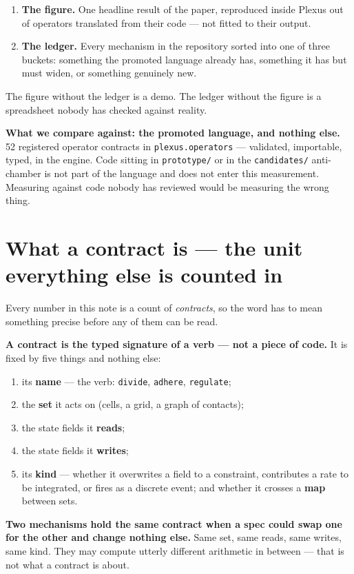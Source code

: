 \documentclass[11pt,a4paper]{article}
\newcommand{\code}[1]{\texttt{#1}}
\begin{document}
\begin{enumerate}
\item \textbf{The figure.} One headline result of the paper, reproduced inside Plexus out of
operators translated from their code --- not fitted to their output.
\item \textbf{The ledger.} Every mechanism in the repository sorted into one of three buckets:
something the promoted language already has, something it has but must widen, or something
genuinely new.
\end{enumerate}

The figure without the ledger is a demo. The ledger without the figure is a spreadsheet nobody
has checked against reality.

\begin{tcolorbox}[colback=grey!6,colframe=grey!45,boxrule=0.7pt,arc=2pt]
\textbf{What we compare against: the promoted language, and nothing else.} 52 registered operator
contracts in \code{plexus.operators} --- validated, importable, typed, in the engine. Code sitting
in \code{prototype/} or in the \code{candidates/} anti-chamber is not part of the language and
does not enter this measurement. Measuring against code nobody has reviewed would be measuring
the wrong thing.
\end{tcolorbox}

\section{What a contract is --- the unit everything else is counted in}\label{sec:contract}

Every number in this note is a count of \emph{contracts}, so the word has to mean something
precise before any of them can be read.

\begin{tcolorbox}[colback=rule!4,colframe=rule!55,boxrule=0.9pt,arc=2pt]
\textbf{A contract is the typed signature of a verb --- not a piece of code.} It is fixed by five
things and nothing else:

\begin{enumerate}[leftmargin=1.5em,itemsep=1pt]
\item its \textbf{name} --- the verb: \code{divide}, \code{adhere}, \code{regulate};
\item the \textbf{set} it acts on (cells, a grid, a graph of contacts);
\item the state fields it \textbf{reads};
\item the state fields it \textbf{writes};
\item its \textbf{kind} --- whether it overwrites a field to a constraint, contributes a rate to
be integrated, or fires as a discrete event; and whether it crosses a \textbf{map} between sets.
\end{enumerate}

\textbf{Two mechanisms hold the same contract when a spec could swap one for the other and change
nothing else.} Same set, same reads, same writes, same kind. They may compute utterly different
arithmetic in between --- that is not what a contract is about.
\end{tcolorbox}
\end{document}
